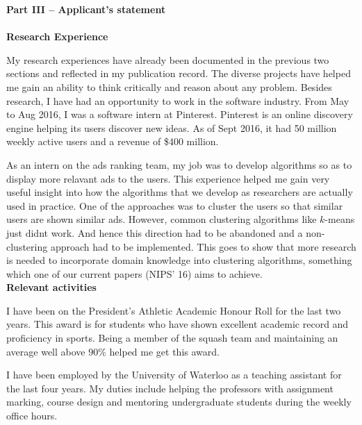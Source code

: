 \documentclass[12pt]{article}
\begin{document}
\vspace{0.2in}\noindent\textbf{Part III – Applicant's statement}\\\\
\textbf{Research Experience}

\vspace{0.1in}\noindent My research experiences have already been documented in the previous two sections and reflected in my publication record. The diverse projects have helped me gain an ability to think critically and reason about any problem. Besides research, I have had an opportunity to work in the software industry. From May to Aug 2016, I was a software intern at Pinterest. Pinterest is an online discovery engine helping its users discover new ideas. As of Sept 2016, it had 50 million weekly active users and a revenue of \$400 million. 

As an intern on the ads ranking team, my job was to develop algorithms so as to display more relavant ads to the users. This experience helped me gain very useful insight into how the algorithms that we develop as researchers are actually used in practice. One of the approaches was to cluster the users so that similar users are shown similar ads. However, common clustering algorithms like  $k$-means just didnt work. And hence this direction had to be abandoned and a non-clustering approach had to be implemented. This goes to show that more research is needed to incorporate domain knowledge into clustering algorithms, something which one of our current papers (NIPS' 16) aims to achieve. \\

\noindent\textbf{Relevant activities}

\vspace{0.1in}\noindent 
I have been on the President's Athletic Academic Honour Roll for the last two years. This award is for students who have shown excellent academic record and proficiency in sports. Being a member of the squash team and maintaining an average well above $90\%$ helped me get this award. 

\noindent I have been employed by the University of Waterloo as a teaching assistant for the last four years. My duties include helping the professors with assignment marking, course design and mentoring undergraduate students during the weekly office hours. 
\end{document}
